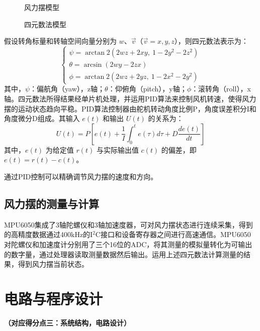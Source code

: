 \documentclass[zihao=-4,fontset=none]{ctexart}
\begin{document}
\begin{figure}[H]
    \centering
    \caption{风力摆模型}
    \label{fig:wind_model}
\end{figure}

\begin{figure}[H]
    \centering
    \caption{四元数法模型}
    \label{fig:quaternion}
\end{figure}

假设转角标量和转轴空间向量分别为 $w$、$\vec{v}$（$\vec{v} = x,y,z$），则四元数法表示为：
\begin{equation}
    \begin{cases}
        \psi = \arctan 2(2wz + 2xy,\ 1 - 2y^2 - 2z^2) \\
        \theta = \arcsin (2wy - 2zx) \\
        \phi = \arctan 2(2wz + 2yz,\ 1 - 2x^2 - 2y^2)
    \end{cases} \tag{1}
\end{equation}
其中，$\psi$：偏航角（yaw），z轴；$\theta$：仰俯角（pitch），y轴；$\phi$：滚转角（roll），x轴。四元数法所得结果经单片机处理，并运用PID算法来控制风机转速，使得风力摆的运动状态趋向平稳。PID算法控制器由舵机转动角度比例P，角度误差积分I和角度微分D组成。其输入 $e(t)$ 和输出 $U(t)$ 的关系为：
\begin{equation}
    U(t) = P\left[e(t) + \frac{1}{I}\int_0^t e(\tau)d\tau + D\frac{de(t)}{dt}\right] \tag{2}
\end{equation}
其中，$e(t)$ 为给定值 $r(t)$ 与实际输出值 $c(t)$ 的偏差，即 $e(t) = r(t) - c(t)$。

通过PID控制可以精确调节风力摆的速度和方向。

\subsection{风力摆的测量与计算}

MPU6050集成了3轴陀螺仪和3轴加速度器，可对风力摆状态进行连续采集，得到的高精度数据通过400kHz的I$^2$C接口和设备寄存器之间进行高速通信。MPU6050对陀螺仪和加速度计分别用了三个16位的ADC，将其测量的模拟量转化为可输出的数字量，通过处理器读取测量数据然后输出。运用上述四元数法计算测量的结果，得到风力摆当前状态。

\section{电路与程序设计}
\textbf{（对应得分点三：系统结构，电路设计）}
\end{document}
